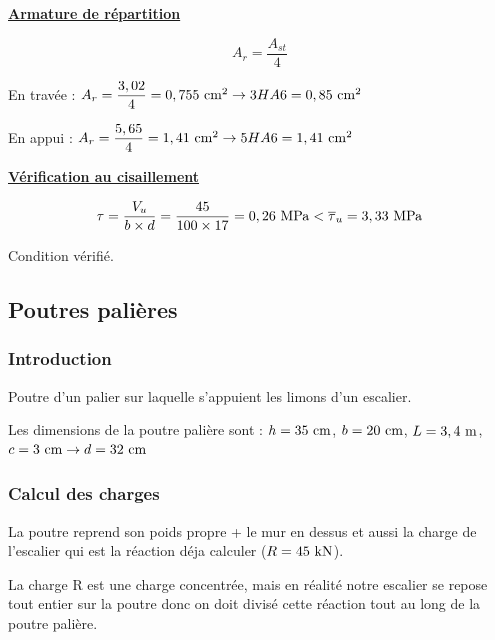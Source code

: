\vspace{5\baselineskip}

\textbf{\underline{Armature de répartition}}

\[ A_{r} = \dfrac{A_{st}}{4} \]

En travée : $A_{r} = \dfrac{3,02}{4} = 0,755\cmsq \rightarrow 3HA6 = 0,85\cmsq$

En appui : $A_{r} = \dfrac{5,65}{4} = 1,41\cmsq \rightarrow 5HA6 = 1,41\cmsq$


\vspace{\baselineskip}

\textbf{\underline{Vérification au cisaillement}}

\[ \tau = \dfrac{V_{u}}{b \times d} = \dfrac{45}{100 \times 17} = 0,26\mpa < \taubar{u} = 3,33\mpa \]
{\centering Condition vérifié.\par}





\subsection{Poutres palières}

\subsubsection{Introduction}

Poutre d'un palier sur laquelle s'appuient les limons d'un escalier.

\vspace{\baselineskip}

Les dimensions de la poutre palière sont : $h = 35\cml$, $b = 20\cml$, $L = 3,4\meterl$, $c = 3\cml \rightarrow d = 32\cml$

\subsubsection{Calcul des charges}

La poutre reprend son poids propre + le mur en dessus et aussi la charge de l'escalier qui est la réaction déja calculer ($R = 45\kn$).

\vspace{\baselineskip}

La charge R est une charge concentrée, mais en réalité notre escalier se repose tout entier sur la poutre donc on doit divisé cette réaction tout au long de la poutre palière.

